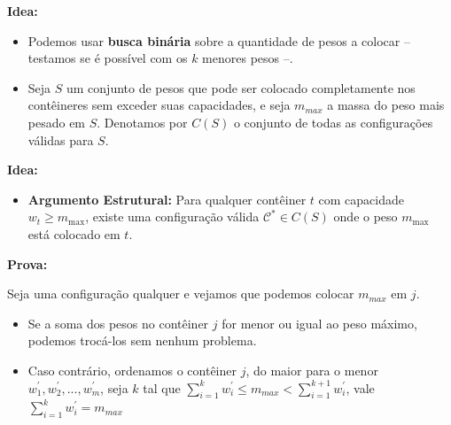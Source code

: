 \documentclass[12pt]{beamer}
\begin{document}
\begin{frame}
\begin{bloco}[\textcolor{black}{POI 2007 Weights} (\href{https://szkopul.edu.pl/problemset/problem/h_QPStxSmfEHuL2h_I5Qpa29/site/?key=statement}{szkopul})]

\textbf{Idea:} 

\begin{itemize}
    \item Podemos usar \textbf{busca binária} sobre a quantidade de pesos a colocar -- testamos se é possível com os $k$ menores pesos --.
    \pause
    \item Seja $S$ um conjunto de pesos que pode ser colocado completamente nos contêineres sem exceder suas capacidades, e seja $m_{max}$ a massa do peso mais pesado em $S$. Denotamos por $C(S)$ o conjunto de todas as configurações válidas para $S$.
\end{itemize}
\end{bloco}
\end{frame}

\begin{frame}
\begin{bloco}[\textcolor{black}{POI 2007 Weights} (\href{https://szkopul.edu.pl/problemset/problem/h_QPStxSmfEHuL2h_I5Qpa29/site/?key=statement}{szkopul})]

\textbf{Idea:} 

\begin{itemize}
    \item \textbf{Argumento Estrutural:} 
    Para qualquer contêiner $t$ com capacidade $w_t \geq m_{\max}$, existe uma configuração válida $\mathcal{C}^* \in C(S)$ onde o peso $m_{\max}$ está colocado em $t$.
\end{itemize}
\end{bloco}
\end{frame}

\begin{frame}
\begin{bloco}[\textcolor{black}{POI 2007 Weights} (\href{https://szkopul.edu.pl/problemset/problem/h_QPStxSmfEHuL2h_I5Qpa29/site/?key=statement}{szkopul})]

\textbf{Prova:} 

Seja uma configuração qualquer e vejamos que podemos colocar $m_{max}$ em $j$.   

\begin{itemize}
    \item Se a soma dos pesos no contêiner $j$ for menor ou igual ao peso máximo, podemos trocá-los sem nenhum problema. 
    \pause
    \item Caso contrário, ordenamos o contêiner $j$, do maior para o menor $w^{'}_1, w^{'}_2, ..., w^{'}_m$, seja $k$ tal que \(\sum\limits_{i=1}^k w^{'}_i \le m_{max} < \sum\limits_{i=1}^{k+1} w^{'}_i\), vale $\sum\limits_{i=1}^k w^{'}_i = m_{max}$ 
\end{itemize}
\end{bloco}

\end{frame}
\end{document}
